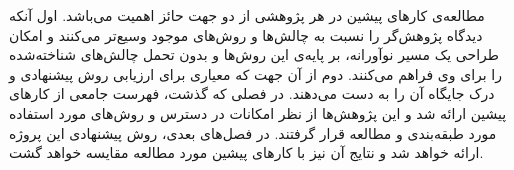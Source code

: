 

مطالعه‌ی کارهای پیشین در هر پژوهشی از دو جهت حائز اهمیت می‌باشد.
اول آنکه دیدگاه پژوهش‌گر را نسبت به چالش‌ها و روش‌های موجود وسیع‌تر می‌کنند و 
امکان طراحی یک مسیر نوآورانه، بر پایه‌ی این روش‌ها و بدون تحمل چالش‌های شناخته‌شده را برای وی فراهم می‌کنند.
دوم از آن جهت که معیاری برای ارزیابی روش پیشنهادی
و درک جایگاه آن را به دست می‌دهند.
در فصلی که گذشت، 
فهرست جامعی از کار‌های پیشین ارائه شد و این پژوهش‌ها از نظر امکانات در دسترس و روش‌های مورد استفاده مورد طبقه‌بندی و مطالعه قرار گرفتند.
در فصل‌های بعدی، روش پیشنهادی این پروژه ارائه خواهد شد و نتایج آن نیز با کار‌های پیشین مورد مطالعه مقایسه خواهد گشت.